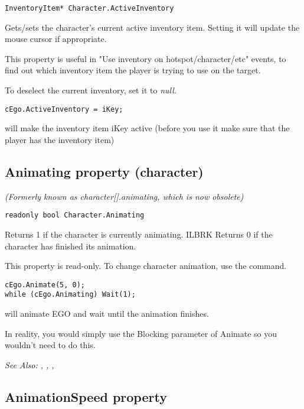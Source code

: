 \begin{verbatim}
InventoryItem* Character.ActiveInventory
\end{verbatim}
Gets/sets the character's current active inventory item.
Setting it will update the mouse cursor if appropriate.

This property is useful in "Use inventory on hotspot/character/etc" events, to
find out which inventory item the player is trying to use on the target.

To deselect the current inventory, set it to \it{null}.

\begin{verbatim}
cEgo.ActiveInventory = iKey;
\end{verbatim}
will make the inventory item iKey active (before you use it make sure that the player
has the inventory item)


\subsection{Animating property (character)}\label{Character.Animating}%

\it{(Formerly known as character[].animating, which is now obsolete)}

\begin{verbatim}
readonly bool Character.Animating
\end{verbatim}
Returns 1 if the character is currently animating. ILBRK
Returns 0 if the character has finished its animation.

This property is read-only. To change character animation, use the
 command.

\begin{verbatim}
cEgo.Animate(5, 0);
while (cEgo.Animating) Wait(1);
\end{verbatim}
will animate EGO and wait until the animation finishes.

In reality, you would simply use the Blocking parameter of Animate so you wouldn't need
to do this.

\it{See Also:} ,
,
,


\subsection{AnimationSpeed property}\label{Character.AnimationSpeed}%

